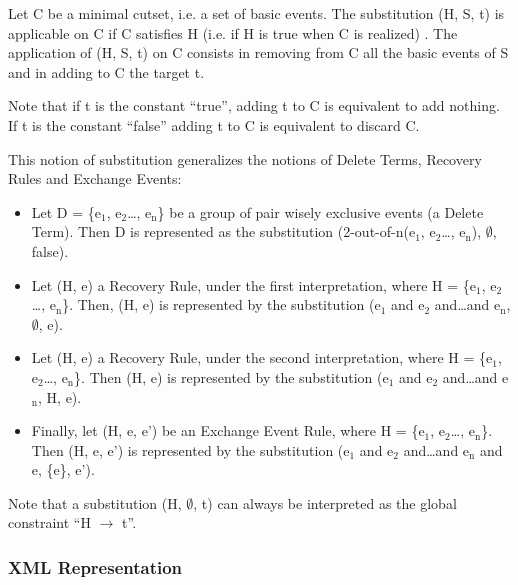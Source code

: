\documentclass[11pt]{article}
\begin{document}
Let C be a minimal cutset, i.e. a set of basic events. The substitution
(H, S, t) is applicable on C if C satisfies H (i.e. if H is true when C
is realized) . The application of (H, S, t) on C consists in removing
from C all the basic events of S and in adding to C the target t.

Note that if t is the constant ``true'', adding t to C is equivalent to
add nothing. If t is the constant ``false'' adding t to C is equivalent to
discard C.

This notion of substitution generalizes the notions of Delete Terms,
Recovery Rules and Exchange Events:

\begin{itemize}
\item Let D = \{e\(_{\text{1}}\), e\(_{\text{2}}\)\ldots{}, e\(_{\text{n}}\)\} be a group of pair wisely exclusive
events (a Delete Term). Then D is represented as the substitution
(2-out-of-n(e\(_{\text{1}}\), e\(_{\text{2}}\)\ldots{}, e\(_{\text{n}}\)), \(\emptyset\), false).

\item Let (H, e) a Recovery Rule, under the first interpretation, where H =
\{e\(_{\text{1}}\), e\(_{\text{2}}\)\ldots{}, e\(_{\text{n}}\)\}. Then, (H, e) is represented by the
substitution (e\(_{\text{1}}\) and e\(_{\text{2}}\) and\ldots{}and e\(_{\text{n}}\), \(\emptyset\), e).

\item Let (H, e) a Recovery Rule, under the second interpretation, where H
= \{e\(_{\text{1}}\), e\(_{\text{2}}\)\ldots{}, e\(_{\text{n}}\)\}. Then (H, e) is represented by the
substitution (e\(_{\text{1}}\) and e\(_{\text{2}}\) and\ldots{}and e\(_{\text{n}}\), H, e).

\item Finally, let (H, e, e') be an Exchange Event Rule, where H = \{e\(_{\text{1}}\),
e\(_{\text{2}}\)\ldots{}, e\(_{\text{n}}\)\}. Then (H, e, e') is represented by the substitution
(e\(_{\text{1}}\) and e\(_{\text{2}}\) and\ldots{}and e\(_{\text{n}}\) and e, \{e\}, e').
\end{itemize}

Note that a substitution (H, \(\emptyset\), t) can always be interpreted as the
global constraint ``H \(\rightarrow\) t''.

\subsubsection{XML Representation}
\label{sec:org21881f9}
\end{document}
